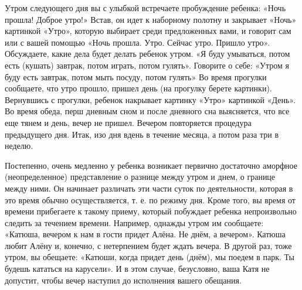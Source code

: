 \documentclass{book}
\begin{document}
Утром следующего дня вы с улыбкой встречаете пробуждение ребенка: «Ночь
прошла! Доброе утро!» Встав, он идет к наборному полотну и закрывает
«Ночь» картинкой «Утро», которую выбирает среди предложенных вами, и
говорит сам или с вашей помощью «Ночь прошла. Утро. Сейчас утро. Пришло
утро». Обсуждаете, какие дела будет делать ребенок утром. «Я буду
умываться, потом есть (кушать) завтрак, потом играть, потом гулять».
Говорите о себе: «Утром я буду есть завтрак, потом мыть посуду, потом
гулять» Во время прогулки сообщаете, что утро прошло, пришел день (на
прогулку берете картинки). Вернувшись с прогулки, ребенок накрывает
картинку «Утро» картинкой «День». Во время обеда, перш дневным сном и
после дневного сна выясняется, что все еще тянем и день, вечер не
пришел. Вечером повторяется процедура предыдущего дня. Итак, изо дня
вдень в течение месяца, а потом раза три в неделю.

Постепенно, очень медленно у ребенка возникает первично достаточно
аморфное (неопределенное) представление о разнице между утром и днем, о
границе между ними. Он начинает различать эти части суток по
деятельности, которая в это время обычно осуществляется, т. е. по режиму
дня. Кроме того, вы время от времени прибегаете к такому приему, который
побуждает ребенка непроизвольно следить за течением времени. Например,
однажды утром им сообщаете: «Катюша, вечером к нам в гости придет Алёна.
Не днём, а вечером». Катюша любит Алёну и, конечно, с нетерпением будет
ждать вечера. В другой раз, тоже утром, вы обещаете: «Катюши, когда
придет день (днём), мы поедем в парк. Ты будешь кататься на карусели». И
в этом случае, безусловно, ваша Катя не допустит, чтобы вечер наступил
до исполнения вашего обещания.
\end{document}
